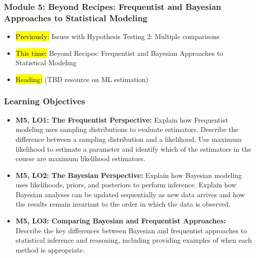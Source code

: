 
\begin{frame}
    \frametitle{Module 5: Beyond Recipes: Frequentist and Bayesian Approaches to Statistical Modeling}
    \begin{itemize}
        \item \hl{Previously: }Issues with Hypothesis Testing 2: Multiple comparisons
        \item \hl{This time: }Beyond Recipes: Frequentist and Bayesian Approaches to Statistical Modeling
        \item \hl{Reading: }(TBD resource on ML estimation)
    \end{itemize}

\end{frame}
\begin{frame}
    \frametitle{Learning Objectives}
    \begin{itemize}
        \item \textbf{M5, LO1: The Frequentist Perspective:} Explain how Frequentist modeling uses sampling distributions to evaluate estimators. Describe the difference between a sampling distribution and a likelihood. Use maximum likelihood to estimate a parameter and identify which of the estimators in the course are maximum likelihood estimators.
        \item \textbf{M5, LO2: The Bayesian Perspective:} Explain how Bayesian modeling uses likelihoods, priors, and posteriors to perform inference. Explain how Bayesian analyses can be updated sequentially as new data arrives and how the results remain invariant to the order in which the data is observed.
        \item \textbf{M5, LO3: Comparing Bayesian and Frequentist Approaches:} Describe the key differences between Bayesian and frequentist approaches to statistical inference and reasoning, including providing examples of when each method is appropriate.
    \end{itemize}
\end{frame}
